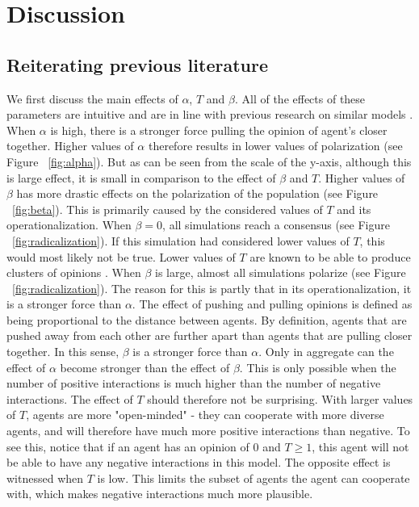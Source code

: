 \documentclass{article}
\begin{document}
\section{Discussion}

\subsection{Reiterating previous literature}

We first discuss the main effects of $\alpha$, $T$ and $\beta$. All of the effects of these parameters are intuitive and are in line with previous research on similar models \cite{flache_models_2017}. When $\alpha$ is high, there is a stronger force pulling the opinion of agent's closer together. Higher values of $\alpha$ therefore results in lower values of polarization (see Figure ~\ref{fig:alpha}). 
But as can be seen from the scale of the y-axis, although this is large effect, it is small in comparison to the effect of $\beta$ and $T$. Higher values of $\beta$ has more drastic effects on the polarization of the population (see Figure ~\ref{fig:beta}). 
This is primarily caused by the considered values of $T$ and its operationalization. When $\beta = 0$, all simulations reach a consensus (see Figure ~\ref{fig:radicalization}). If this simulation had considered lower values of $T$, this would most likely not be true. Lower values of $T$ are known to be able to produce clusters of opinions \cite{flache_models_2017,sasahara_social_2021}. When $\beta$ is large, almost all simulations polarize (see Figure ~\ref{fig:radicalization}). The reason for this is partly that in its operationalization, it is a stronger force than $\alpha$. The effect of pushing and pulling opinions is defined as being proportional to the distance between agents. 
By definition, agents that are pushed away from each other are further apart than agents that are pulling closer together. In this sense, $\beta$ is a stronger force than $\alpha$. Only in aggregate can the effect of $\alpha$ become stronger than the effect of $\beta$. This is only possible when the number of positive interactions is much higher than the number of negative interactions. The effect of $T$ should therefore not be surprising. With larger values of $T$, agents are more "open-minded" - they can cooperate with more diverse agents, and will therefore have much more positive interactions than negative. To see this, notice that if an agent has an opinion of 0 and $T\geq1$, this agent will not be able to have any negative interactions in this model. The opposite effect is witnessed when $T$ is low. This limits the subset of agents the agent can cooperate with, which makes negative interactions much more plausible.
\end{document}
